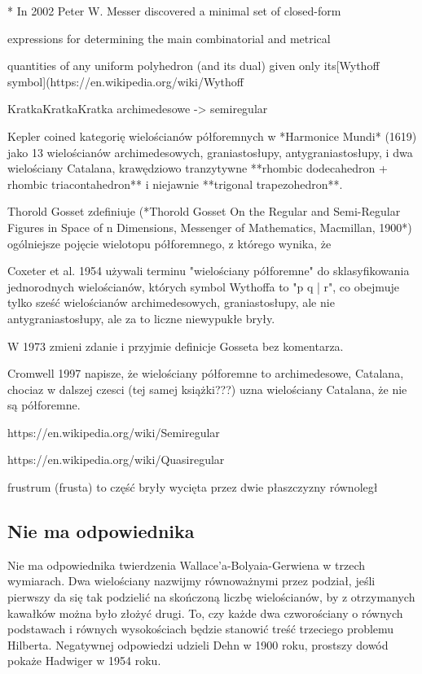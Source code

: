 * In 2002 Peter W. Messer discovered a minimal set of closed-form

expressions for determining the main combinatorial and metrical

quantities of any uniform polyhedron (and its dual) given only its[Wythoff symbol](https://en.wikipedia.org/wiki/Wythoff%

KratkaKratkaKratka archimedesowe -> semiregular

Kepler coined kategorię wielościanów półforemnych w *Harmonice Mundi* (1619) jako 13 wielościanów archimedesowych, graniastosłupy, antygraniastosłupy, i dwa wielościany Catalana, krawędziowo tranzytywne **rhombic dodecahedron + rhombic triacontahedron** i niejawnie **trigonal trapezohedron**.

Thorold Gosset zdefiniuje (*Thorold Gosset On the Regular and Semi-Regular Figures in Space of n Dimensions, Messenger of Mathematics, Macmillan, 1900*) ogólniejsze pojęcie wielotopu półforemnego, z którego wynika, że

Coxeter et al. 1954 używali terminu "wielościany półforemne" do sklasyfikowania jednorodnych wielościanów, których symbol Wythoffa to "p q | r", co obejmuje tylko sześć wielościanów archimedesowych, graniastosłupy, ale nie antygraniastosłupy, ale za to liczne niewypukłe bryły.

W 1973 zmieni zdanie i przyjmie definicje Gosseta bez komentarza.

Cromwell 1997 napisze, że wielościany półforemne to archimedesowe, Catalana, chociaz w dalszej czesci (tej samej książki???) uzna wielościany Catalana, że nie są półforemne.

https://en.wikipedia.org/wiki/Semiregular%

https://en.wikipedia.org/wiki/Quasiregular%

frustrum (frusta) to część bryły wycięta przez dwie płaszczyzny równoległ



\subsection{Nie ma odpowiednika}
Nie ma odpowiednika twierdzenia Wallace'a-Bolyaia-Gerwiena w trzech wymiarach.
Dwa wielościany nazwijmy równoważnymi przez podział, jeśli pierwszy da się tak podzielić na skończoną liczbę wielościanów, by z otrzymanych kawałków można było złożyć drugi.
To, czy każde dwa czworościany o równych podstawach i równych wysokościach będzie stanowić treść trzeciego problemu Hilberta.
Negatywnej odpowiedzi udzieli Dehn w 1900 roku, prostszy dowód pokaże Hadwiger w 1954 roku.

